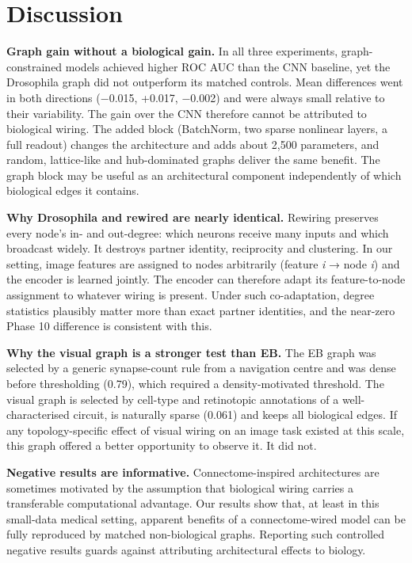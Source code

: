 \section{Discussion}
\label{sec:06_discussion}

\textbf{Graph gain without a biological gain.} In all three experiments, graph-constrained models achieved higher ROC AUC than the CNN baseline, yet the Drosophila graph did not outperform its matched controls. Mean differences went in both directions (−0.015, +0.017, −0.002) and were always small relative to their variability. The gain over the CNN therefore cannot be attributed to biological wiring. The added block (BatchNorm, two sparse nonlinear layers, a full readout) changes the architecture and adds about 2,500 parameters, and random, lattice-like and hub-dominated graphs deliver the same benefit. The graph block may be useful as an architectural component independently of which biological edges it contains.

\textbf{Why Drosophila and rewired are nearly identical.} Rewiring preserves every node's in- and out-degree: which neurons receive many inputs and which broadcast widely. It destroys partner identity, reciprocity and clustering. In our setting, image features are assigned to nodes arbitrarily (feature \emph{i} → node \emph{i}) and the encoder is learned jointly. The encoder can therefore adapt its feature-to-node assignment to whatever wiring is present. Under such co-adaptation, degree statistics plausibly matter more than exact partner identities, and the near-zero Phase 10 difference is consistent with this.

\textbf{Why the visual graph is a stronger test than EB.} The EB graph was selected by a generic synapse-count rule from a navigation centre and was dense before thresholding (0.79), which required a density-motivated threshold. The visual graph is selected by cell-type and retinotopic annotations of a well-characterised circuit, is naturally sparse (0.061) and keeps all biological edges. If any topology-specific effect of visual wiring on an image task existed at this scale, this graph offered a better opportunity to observe it. It did not.

\textbf{Negative results are informative.} Connectome-inspired architectures are sometimes motivated by the assumption that biological wiring carries a transferable computational advantage. Our results show that, at least in this small-data medical setting, apparent benefits of a connectome-wired model can be fully reproduced by matched non-biological graphs. Reporting such controlled negative results guards against attributing architectural effects to biology.

